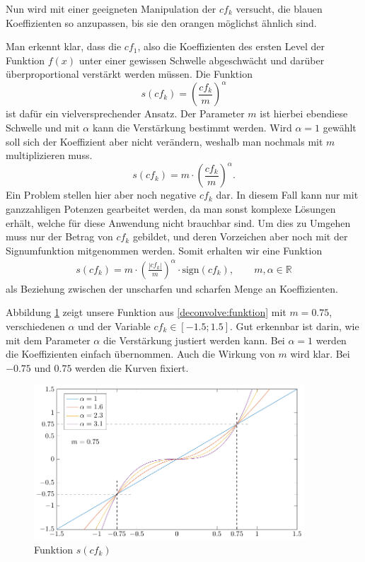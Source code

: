 Nun wird mit einer geeigneten Manipulation der $cf_k$ versucht, die blauen Koeffizienten so anzupassen, bis sie den orangen möglichst ähnlich sind.

Man erkennt klar, dass die $cf_1$, also die Koeffizienten des ersten Level der Funktion $f(x)$ unter einer gewissen Schwelle abgeschwächt und darüber überproportional verstärkt werden müssen.
Die Funktion
$$s(cf_k) = \left( \frac{cf_k}{m}\right)^\alpha$$
ist dafür ein vielversprechender Ansatz.
Der Parameter $m$ ist hierbei ebendiese Schwelle und mit $\alpha$ kann die Verstärkung bestimmt werden.
Wird $\alpha = 1$ gewählt soll sich der Koeffizient aber nicht verändern, weshalb man nochmals mit $m$ multiplizieren muss.
$$s(cf_k) = m\cdot \left( \frac{cf_k}{m}\right)^\alpha.$$
Ein Problem stellen hier aber noch negative $cf_k$ dar. In diesem Fall kann nur mit ganzzahligen Potenzen gearbeitet werden, da man sonst komplexe Lösungen erhält, welche für diese Anwendung nicht brauchbar sind.
Um dies zu Umgehen muss nur der Betrag von $cf_k$ gebildet, und deren Vorzeichen aber noch mit der Signumfunktion mitgenommen werden.
Somit erhalten wir eine Funktion
\begin{align}
s(cf_k)=m\cdot \left(\frac{|cf_k|}{m}\right)^{\alpha}\cdot \text{sign}(cf_k), \qquad m,\alpha\in\mathbb{R}
\label{deconvolve:funktion}
\end{align}
als Beziehung zwischen der \glqq unscharfen\grqq{} und \glqq scharfen\grqq{} Menge an Koeffizienten.

Abbildung \ref{deconvolve:function} zeigt unsere Funktion aus \eqref{deconvolve:funktion} mit $m=0.75$, verschiedenen $\alpha$ und der Variable $cf_k\in[-1.5;1.5]$.
Gut erkennbar ist darin, wie mit dem Parameter $\alpha$ die Verstärkung justiert werden kann.
Bei $\alpha = 1$ werden die Koeffizienten einfach übernommen.
Auch die Wirkung von $m$ wird klar.
Bei $-0.75$ und $0.75$ werden die Kurven fixiert.
\begin{figure}[h]
\centering
\includegraphics[width=0.9\textwidth]{./papers/deconvolve/pictures/function.pdf}
\caption{Funktion $s(cf_k)$\label{deconvolve:function}}
\end{figure}

